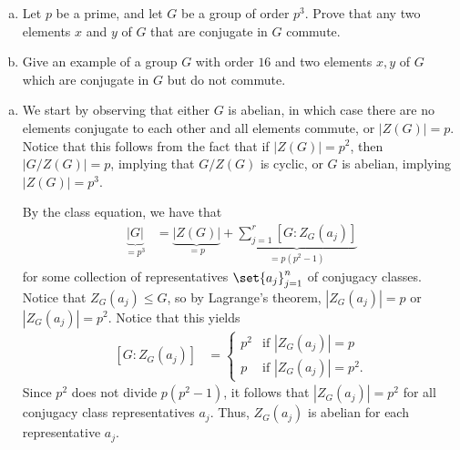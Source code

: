 \documentclass[10pt]{mypackage}
\begin{document}
\begin{problem}[Problem 3]\hfill
  \begin{enumerate}[(a)]
    \item Let $p$ be a prime, and let $G$ be a group of order $p^3$. Prove that any two elements $x$ and $y$ of $G$ that are conjugate in $G$ commute.
    \item Give an example of a group $G$ with order $16$ and two elements $x,y$ of $G$ which are conjugate in $G$ but do not commute.
  \end{enumerate}
\end{problem}
\begin{solution}\hfill
  \begin{enumerate}[(a)]
    \item We start by observing that either $G$ is abelian, in which case there are no elements conjugate to each other and all elements commute, or $\left\vert Z(G) \right\vert = p$. Notice that this follows from the fact that if $\left\vert Z(G) \right\vert = p^2$, then $\left\vert G/Z(G) \right\vert = p$, implying that $G/Z(G)$ is cyclic, or $G$ is abelian, implying $\left\vert Z(G) \right\vert = p^3$.

      By the class equation, we have that
      \begin{align*}
        \underbrace{\left\vert G \right\vert}_{=p^3} &= \underbrace{\left\vert Z(G) \right\vert}_{=p} + \underbrace{\sum_{j=1}^{r} \left[ G:Z_G\left( a_j \right) \right]}_{=p\left( p^2-1 \right)}
      \end{align*}
      for some collection of representatives $\set{a_j}_{j=1}^{n}$ of conjugacy classes. Notice that $Z_G\left( a_j \right)\leq G$, so by Lagrange's theorem, $\left\vert Z_G\left( a_j \right) \right\vert = p$ or $\left\vert Z_G\left( a_j \right) \right\vert = p^2$. Notice that this yields
      \begin{align*}
        \left[ G:Z_G\left( a_j \right) \right] &= \begin{cases}
          p^2 & \text{if }\left\vert Z_G\left( a_j \right) \right\vert = p\\
          p & \text{if } \left\vert Z_G\left( a_j \right) \right\vert = p^2.
        \end{cases}
      \end{align*}
      Since $p^2$ does not divide $p\left( p^2-1 \right)$, it follows that $\left\vert Z_G\left( a_j \right) \right\vert = p^2$ for all conjugacy class representatives $a_j$. Thus, $Z_G\left( a_j \right)$ is abelian for each representative $a_j$.


\end{enumerate}
\end{solution}
\end{document}
